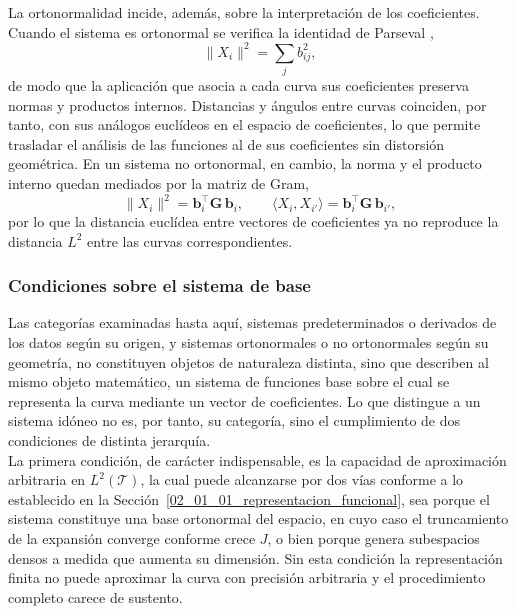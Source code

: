 La ortonormalidad incide, además, sobre la interpretación de los coeficientes. Cuando el sistema es ortonormal se verifica la identidad de Parseval \citep{02_01_kokoszka2017introduction},
\begin{equation}
    \|X_i\|^2 = \sum_{j}b_{ij}^2,
\end{equation}
de modo que la aplicación que asocia a cada curva sus coeficientes preserva normas y productos internos. Distancias y ángulos entre curvas coinciden, por tanto, con sus análogos euclídeos en el espacio de coeficientes, lo que permite trasladar el análisis de las funciones al de sus coeficientes sin distorsión geométrica. En un sistema no ortonormal, en cambio, la norma y el producto interno quedan mediados por la matriz de Gram,
\begin{equation}
    \|X_i\|^2 = \mathbf{b}_i^\top \mathbf{G}\,\mathbf{b}_i,
    \qquad
    \langle X_i, X_{i'}\rangle = \mathbf{b}_i^\top \mathbf{G}\,\mathbf{b}_{i'},
\end{equation}
por lo que la distancia euclídea entre vectores de coeficientes ya no reproduce la distancia $L^2$ entre las curvas correspondientes.

\subsubsection{Condiciones sobre el sistema de base}
\label{02_01_02_02_condiciones_sistema_base}
Las categorías examinadas hasta aquí, sistemas predeterminados o derivados de los datos según su origen, y sistemas ortonormales o no ortonormales según su geometría, no constituyen objetos de naturaleza distinta, sino que describen al mismo objeto matemático, un sistema de funciones base sobre el cual se representa la curva mediante un vector de coeficientes. Lo que distingue a un sistema idóneo no es, por tanto, su categoría, sino el cumplimiento de dos condiciones de distinta jerarquía.\\

La primera condición, de carácter indispensable, es la capacidad de aproximación arbitraria en $L^2(\mathcal{T})$, la cual puede alcanzarse por dos vías conforme a lo establecido en la Sección~\ref{02_01_01_representacion_funcional}, sea porque el sistema constituye una base ortonormal del espacio, en cuyo caso el truncamiento de la expansión converge conforme crece $J$, o bien porque genera subespacios densos a medida que aumenta su dimensión. Sin esta condición la representación finita no puede aproximar la curva con precisión arbitraria y el procedimiento completo carece de sustento.\\

